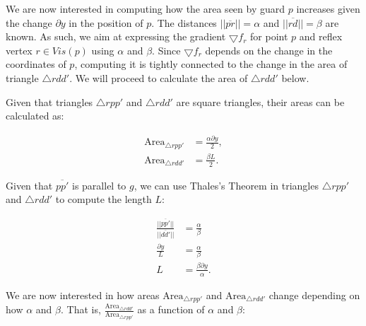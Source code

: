 
We are now interested in computing how the area seen by guard $p$ increases given the change $\partial y$ in the position of $p$. The distances $||\overline{pr}|| = \alpha$ and $||\overline{rd}|| = \beta$ are known. As such, we aim at expressing the gradient $\bigtriangledown f_r$ for point $p$ and reflex vertex $r \in Vis(p)$ using $\alpha$ and $\beta$. Since $\bigtriangledown f_r$ depends on the change in the coordinates of $p$, computing it is tightly connected to the change in the area of triangle $\triangle rdd'$. We will proceed to calculate the area of $\triangle rdd'$ below.

Given that triangles $\triangle rpp'$ and $\triangle rdd'$ are square triangles, their areas can be calculated as:

\begin{align}
    \text{Area}_{\triangle rpp'} &= \frac{\alpha \partial y}{2}, \label{eq:rpp}\\
    \text{Area}_{\triangle rdd'} &= \frac{\beta L}{2}. \label{eq:rdd}   
\end{align}


Given that $\overline{pp'}$ is parallel to $g$, we can use Thales's Theorem in triangles $\triangle rpp'$ and $\triangle rdd'$ to compute the length $L$: 

\begin{align}
    \frac{||\overline{pp'}||}{||\overline{dd'}||} &= \frac \alpha \beta \\
    \frac{\partial y}{L} &= \frac \alpha \beta  \label{eq:dxL} \\
    L &= \frac{\beta \partial y}{\alpha}. \label{eq:L}
\end{align}



We are now interested in how areas $\text{Area}_{\triangle rpp'}$ and $\text{Area}_{\triangle rdd'}$ change depending on how $\alpha$ and $\beta$. That is, $\frac{\text{Area}_{\triangle rdd'}}{\text{Area}_{\triangle rpp'}}$ as a function of $\alpha$ and $\beta$: 

